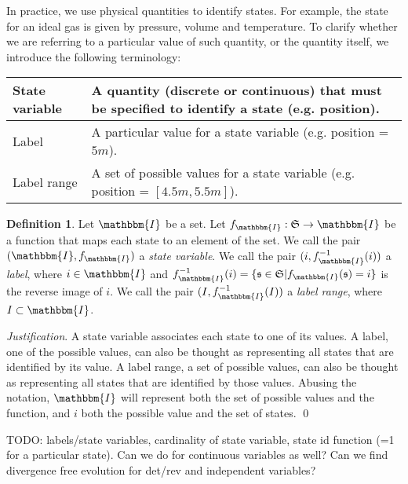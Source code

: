 \documentclass[aps,pra,10pt,twocolumn,floatfix,nofootinbib]{revtex4-1}
\theoremstyle{definition}
\newtheorem{defn}[prop]{Definition}
\newenvironment{justification}{\emph{Justification}.}{\qed}
\begin{document}
In practice, we use physical quantities to identify states. For example, the state for an ideal gas is given by pressure, volume and temperature. To clarify whether we are referring to a particular value of such quantity, or the quantity itself, we introduce the following terminology:
\begin{center}
    \begin{tabular}{ | p{2.5cm} | p{5.5cm} | }
    \hline
    State variable & A quantity (discrete or continuous) that must be specified to identify a state (e.g. position). \\ \hline
    Label & A particular value for a state variable (e.g. position = $5m$). \\ \hline
    Label range & A set of possible values for a state variable (e.g. position = $[4.5m, 5.5m]$). \\
    \hline
    \end{tabular}
\end{center}

\begin{defn}\label{label}
Let $\mathbbm{I}$ be a set. Let $f_\mathbbm{I} : \mathfrak{S} \rightarrow \mathbbm{I}$ be a function that maps each state to an element of the set. We call the pair $(\mathbbm{I}, f_\mathbbm{I})$ a \emph{state variable}. We call the pair $(i, f_\mathbbm{I}^{-1}(i))$ a \emph{label}, where $i \in \mathbbm{I}$ and $f_\mathbbm{I}^{-1}(i) = \{\mathfrak{s} \in \mathfrak{S} | f_\mathbbm{I}(\mathfrak{s}) = i\}$ is the reverse image of $i$. We call the pair $(I, f_\mathbbm{I}^{-1}(I))$ a \emph{label range}, where $I \subset \mathbbm{I}$.
\end{defn}

\begin{justification}
A state variable associates each state to one of its values. A label, one of the possible values, can also be thought as representing all states that are identified by its value. A label range, a set of possible values, can also be thought as representing all states that are identified by those values. Abusing the notation, $\mathbbm{I}$ will represent both the set of possible values and the function, and $i$ both the possible value and the set of states.
\end{justification}

TODO: labels/state variables, cardinality of state variable, state id function (=1 for a particular state). Can we do for continuous variables as well? Can we find divergence free evolution for det/rev and independent variables?
\end{document}

